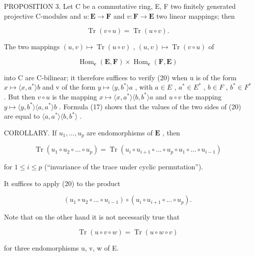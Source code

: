 PROPOSITION 3. Let C be a commutative ring, E, F two finitely generated projective C-modules and \(u: \mathbf{E} \to \mathbf{F}\) and \(v: \mathbf{F} \to \mathbf{E}\) two linear mappings; then

\[
\operatorname{Tr} (v \circ u) = \operatorname{Tr} (u \circ v).\tag{20}
\]

The two mappings \((u, v) \mapsto \operatorname{Tr}(u \circ v)\) , \((u, v) \mapsto \operatorname{Tr}(v \circ u)\) of

\[
\operatorname{Hom} _ {\mathbf {c}} (\mathbf {E}, \mathbf {F}) \times \operatorname{Hom} _ {\mathbf {c}} (\mathbf {F}, \mathbf {E})
\]

into C are C-bilinear; it therefore suffices to verify (20) when u is of the form \(x \mapsto \langle x, a^{*} \rangle b\) and v of the form \(y \mapsto \langle y, b^{*} \rangle a\) , with \(a \in E\) , \(a^{*} \in E^{*}\) , \(b \in F\) , \(b^{*} \in F^{*}\) . But then \(v \circ u\) is the mapping \(x \mapsto \langle x, a^{*} \rangle \langle b, b^{*} \rangle a\) and \(u \circ v\) the mapping \(y \mapsto \langle y, b^{*} \rangle \langle a, a^{*} \rangle b\) . Formula (17) shows that the values of the two sides of (20) are equal to \(\langle a, a^{*} \rangle \langle b, b^{*} \rangle\) .

COROLLARY. If \(u_1, \ldots, u_p\) are endomorphisms of \(\mathbf{E}\) , then

\[
\operatorname{Tr} \left(u _ {1} \circ u _ {2} \circ \dots \circ u _ {p}\right) = \operatorname{Tr} \left(u _ {i} \circ u _ {i + 1} \circ \dots \circ u _ {p} \circ u _ {1} \circ \dots \circ u _ {i - 1}\right)
\]

for \(1 \leqslant i \leqslant p\) (``invariance of the trace under cyclic permutation'').

It suffices to apply (20) to the product

\[
\left(u _ {1} \circ u _ {2} \circ \dots \circ u _ {i - 1}\right) \circ \left(u _ {i} \circ u _ {i + 1} \circ \dots \circ u _ {p}\right).
\]

Note that on the other hand it is not necessarily true that

\[
\operatorname{Tr} (u \circ v \circ w) = \operatorname{Tr} (u \circ w \circ v)
\]

for three endomorphisms u, v, w of E.

